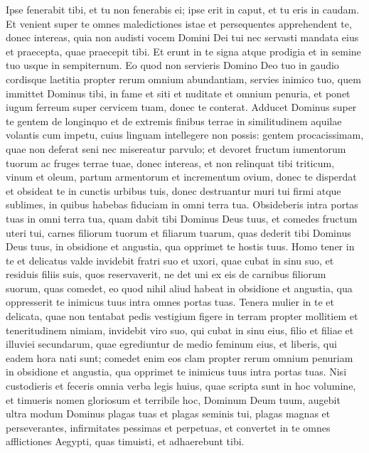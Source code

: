 \begin{biblechapter}
\verse Ipse fenerabit tibi, et tu non fenerabis ei; ipse erit in caput, et tu eris in caudam. 
\verse Et venient super te omnes maledictiones istae et persequentes apprehendent te, donec intereas, quia non audisti vocem Domini Dei tui nec servasti mandata eius et praecepta, quae praecepit tibi. 
\verse Et erunt in te signa atque prodigia et in semine tuo usque in sempiternum. 
\verse Eo quod non servieris Domino Deo tuo in gaudio cordisque laetitia propter rerum omnium abundantiam, 
\verse servies inimico tuo, quem immittet Dominus tibi, in fame et siti et nuditate et omnium penuria, et ponet iugum ferreum super cervicem tuam, donec te conterat. 
\verse Adducet Dominus super te gentem de longinquo et de extremis finibus terrae in similitudinem aquilae volantis cum impetu, cuius linguam intellegere non possis: 
\verse gentem procacissimam, quae non deferat seni nec misereatur parvulo;  
\verse et devoret fructum iumentorum tuorum ac fruges terrae tuae, donec intereas, et non relinquat tibi triticum, vinum et oleum, partum armentorum et incrementum ovium, donec te disperdat 
\verse et obsideat te in cunctis urbibus tuis, donec destruantur muri tui firmi atque sublimes, in quibus habebas fiduciam in omni terra tua. Obsideberis intra portas tuas in omni terra tua, quam dabit tibi Dominus Deus tuus, 
\verse et comedes fructum uteri tui, carnes filiorum tuorum et filiarum tuarum, quas dederit tibi Dominus Deus tuus, in obsidione et angustia, qua opprimet te hostis tuus. 
\verse Homo tener in te et delicatus valde invidebit fratri suo et uxori, quae cubat in sinu suo, et residuis filiis suis, quos reservaverit, 
\verse ne det uni ex eis de carnibus filiorum suorum, quas comedet, eo quod nihil aliud habeat in obsidione et angustia, qua oppresserit te inimicus tuus intra omnes portas tuas. 
\verse Tenera mulier in te et delicata, quae non tentabat pedis vestigium figere in terram propter mollitiem et teneritudinem nimiam, invidebit viro suo, qui cubat in sinu eius, filio et filiae 
\verse et illuviei secundarum, quae egrediuntur de medio feminum eius, et liberis, qui eadem hora nati sunt; comedet enim eos clam propter rerum omnium penuriam in obsidione et angustia, qua opprimet te inimicus tuus intra portas tuas. 
\verse Nisi custodieris et feceris omnia verba legis huius, quae scripta sunt in hoc volumine, et timueris nomen gloriosum et terribile hoc, Dominum Deum tuum,  
\verse augebit ultra modum Dominus plagas tuas et plagas seminis tui, plagas magnas et perseverantes, infirmitates pessimas et perpetuas, 
\verse et convertet in te omnes afflictiones Aegypti, quas timuisti, et adhaerebunt tibi. 

\end{biblechapter}
